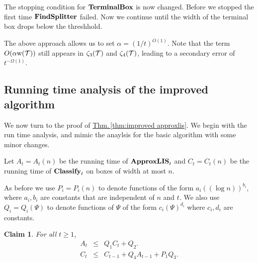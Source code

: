 \documentclass{acmsmall}
\newtheorem{claim}[theorem]{Claim}
\newcommand{\cT}{{\cal T}}
\newcommand{\Thm}[1]{\hyperref[thm:#1]{Thm.\,\ref*{thm:#1}}} %
\newcommand{\terminalbox}{{\rm{\bf TerminalBox}}}
\newcommand{\width}{{\bf {\rm  w}}}
\newcommand{\gridprec}{\alpha}
\newcommand{\errorcont}{\Psi}
\newcommand{\errorterm}{\zeta}
\newcommand{\classify}{{\rm {\bf Classify}}}
\newcommand{\approxlis}{{\rm {\bf ApproxLIS}}}
\newcommand{\findsplitter}{{\rm {\bf FindSplitter}}}
\begin{document}
The stopping condition for $\terminalbox$ is now changed.  Before we stopped the first time
$\findsplitter$ failed.  Now we continue until the width of the terminal box drops below the threshhold.

The above approach allows us to set $\gridprec = (1/t)^{O(1)}$.
Note that the term $O(\gridprec \width(\cT))$ still appears in $\errorterm_3(\cT)$ and $\errorterm_4(\cT)$,
leading to a secondary error of $t^{-\Omega(1)}$.



\subsection{Running time analysis of the improved algorithm}
We now turn to the  proof of \Thm{improved approxlis}. We begin with the run time
analysis, and mimic the anaylsis for the basic algorithm with some minor changes.

Let $A_t=A_t(n)$ be the running time of $\approxlis_t$  and
$C_t=C_t(n)$ be the running time of $\classify_t$ on boxes of width at most $n$.

As before  we use $P_i=P_i(n)$ to denote functions of the form $a_i ((\log n))^{b_i}$, where $a_i,b_i$ are constants that
are independent of $n$ and $t$.  We also use $Q_i=Q_i(\errorcont)$ to denote functions of $\errorcont$ of the form $c_i(\errorcont)^{d_i}$ where $c_i,d_i$ are constants.

\begin{claim} \label{clm:imp-time}
For all $t \geq 1$,
%
\begin{eqnarray*}
A_t & \leq & Q_1 C_t + Q_2. \\
C_t & \leq & C_{t-1}+ Q_4 A_{t-1}+P_1Q_3.
\end{eqnarray*}
%
\end{claim}
\end{document}
